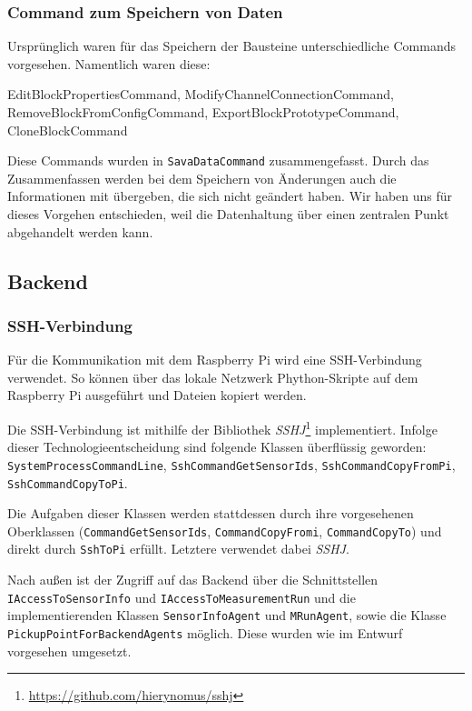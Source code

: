 \documentclass[parskip=full]{scrartcl}
\begin{document}
\subsubsection{Command zum Speichern von Daten}
Ursprünglich waren für das Speichern der Bausteine unterschiedliche Commands vorgesehen. Namentlich waren diese:

    EditBlockPropertiesCommand, ModifyChannelConnectionCommand, RemoveBlockFromConfigCommand, ExportBlockPrototypeCommand, CloneBlockCommand

Diese Commands wurden in \verb|SavaDataCommand| zusammengefasst. Durch das Zusammenfassen werden bei dem Speichern von Änderungen auch die Informationen mit übergeben, die sich nicht geändert haben. Wir haben uns für dieses Vorgehen entschieden, weil die Datenhaltung über einen zentralen Punkt abgehandelt werden kann.

\subsection{Backend}

\subsubsection{SSH-Verbindung}

Für die Kommunikation mit dem Raspberry Pi wird eine SSH-Verbindung verwendet. So können über das lokale Netzwerk Phython-Skripte auf dem Raspberry Pi ausgeführt und Dateien kopiert werden.

Die SSH-Verbindung ist mithilfe der Bibliothek \textit{SSHJ}\footnote{\url{https://github.com/hierynomus/sshj}} implementiert. Infolge dieser Technologieentscheidung sind folgende Klassen überflüssig geworden: \verb:SystemProcessCommandLine:, \verb:SshCommandGetSensorIds:, \verb:SshCommandCopyFromPi:, \verb:SshCommandCopyToPi:.

Die Aufgaben dieser Klassen werden stattdessen durch ihre vorgesehenen Oberklassen (\verb:CommandGetSensorIds:, \verb:CommandCopyFromi:, \verb:CommandCopyTo:) und direkt durch \verb:SshToPi: erfüllt. Letztere verwendet dabei \textit{SSHJ}.

Nach außen ist der Zugriff auf das Backend über die Schnittstellen \verb:IAccessToSensorInfo: und \verb:IAccessToMeasurementRun: und die implementierenden Klassen \verb:SensorInfoAgent: und \verb:MRunAgent:, sowie die Klasse \verb:PickupPointForBackendAgents: möglich. Diese wurden wie im Entwurf vorgesehen umgesetzt.
\end{document}
